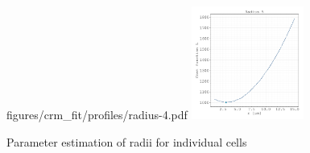 \documentclass{article}
\begin{document}
\begin{figure}[H]
        {figures/crm_fit/profiles/radius-4.pdf}%
    \includegraphics[width=0.33\textwidth]
        {figures/crm_fit/profiles/radius-5.pdf}%
    \caption{Parameter estimation of radii for individual cells}%
    \label{fig:parameter-estimates-supplement-radii}
\end{figure}

\end{document}
